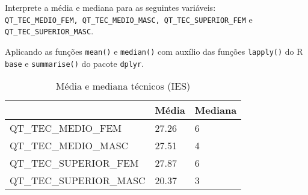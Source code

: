 \documentclass[11pt,]{style/krantz}
\makeatletter
\newenvironment{Shaded}{\begin{snugshade}}{\end{snugshade}}
\newcommand{\ControlFlowTok}[1]{\textcolor[rgb]{0.13,0.29,0.53}{\textbf{#1}}}
\newcommand{\DataTypeTok}[1]{\textcolor[rgb]{0.13,0.29,0.53}{#1}}
\newcommand{\DecValTok}[1]{\textcolor[rgb]{0.00,0.00,0.81}{#1}}
\newcommand{\KeywordTok}[1]{\textcolor[rgb]{0.13,0.29,0.53}{\textbf{#1}}}
\newcommand{\NormalTok}[1]{#1}
\newcommand{\OperatorTok}[1]{\textcolor[rgb]{0.81,0.36,0.00}{\textbf{#1}}}
\newcommand{\OtherTok}[1]{\textcolor[rgb]{0.56,0.35,0.01}{#1}}
\newcommand{\StringTok}[1]{\textcolor[rgb]{0.31,0.60,0.02}{#1}}
\newenvironment{kframe}{%
\medskip{}
\setlength{\fboxsep}{.8em}
 \def\at@end@of@kframe{}%
 \ifinner\ifhmode%
  \def\at@end@of@kframe{\end{minipage}}%
  \begin{minipage}{\columnwidth}%
 \fi\fi%
 \def\FrameCommand##1{\hskip\@totalleftmargin \hskip-\fboxsep
 \colorbox{shadecolor}{##1}\hskip-\fboxsep
     \hskip-\linewidth \hskip-\@totalleftmargin \hskip\columnwidth}%
 \MakeFramed {\advance\hsize-\width
   \@totalleftmargin\z@ \linewidth\hsize
   \@setminipage}}%
 {\par\unskip\endMakeFramed%
 \at@end@of@kframe}
\renewenvironment{Shaded}{\begin{kframe}}{\end{kframe}}
\theoremstyle{definition}
\theoremstyle{definition}
\theoremstyle{definition}
\theoremstyle{remark}
\let\BeginKnitrBlock\begin \let\EndKnitrBlock\end
\makeatother
\begin{document}
\BeginKnitrBlock{exercise}
\protect\hypertarget{exr:unnamed-chunk-59}{}{\label{exr:unnamed-chunk-59} }Interprete a média e mediana para as seguintes variáveis: \texttt{QT\_TEC\_MEDIO\_FEM,\ QT\_TEC\_MEDIO\_MASC,\ QT\_TEC\_SUPERIOR\_FEM} e \texttt{QT\_TEC\_SUPERIOR\_MASC}.
\EndKnitrBlock{exercise}

\BeginKnitrBlock{solution}
\iffalse{} {Solução. } \fi{}Aplicando as funções \texttt{mean()} e \texttt{median()} com auxílio das funções \texttt{lapply()} do R \texttt{base} e \texttt{summarise()} do pacote \texttt{dplyr}.
\EndKnitrBlock{solution}

\begin{Shaded}
\end{Shaded}

\begin{table}[!h]

\caption{\label{tab:unnamed-chunk-61}Média e mediana técnicos (IES)}
\centering
\begin{tabular}{lll}
\toprule
  & Média & Mediana\\
\midrule
QT\_TEC\_MEDIO\_FEM & 27.26 & 6\\
QT\_TEC\_MEDIO\_MASC & 27.51 & 4\\
QT\_TEC\_SUPERIOR\_FEM & 27.87 & 6\\
QT\_TEC\_SUPERIOR\_MASC & 20.37 & 3\\
\bottomrule
\end{tabular}
\end{table}
\end{document}

